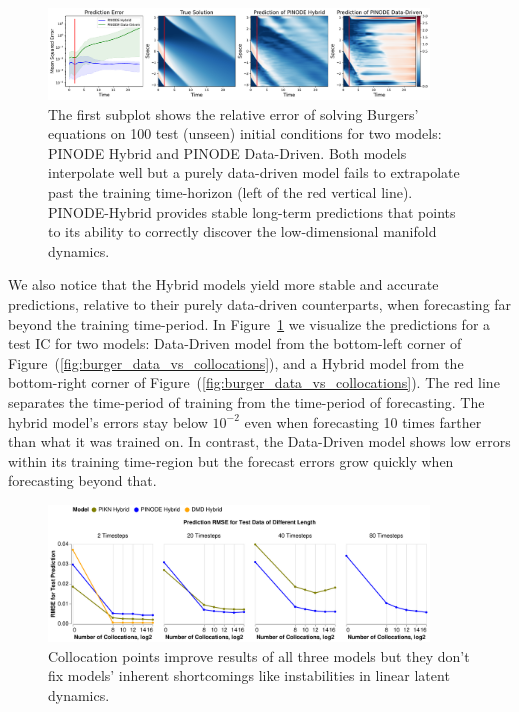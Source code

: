 \begin{figure}[ht]
    \centering
    \includegraphics[width=0.9\textwidth]{figures/example_burgers.pdf}
    \caption{The first subplot shows the relative error of solving Burgers' equations on 100 test (unseen) initial conditions for two models: PINODE Hybrid and PINODE Data-Driven. Both models interpolate well but a purely data-driven model fails to extrapolate past the training time-horizon (left of the red vertical line). PINODE-Hybrid provides stable long-term predictions that points to its ability to correctly discover the low-dimensional manifold dynamics.}
    \label{fig:burgers_example}
\end{figure}

We also notice that the Hybrid models yield more stable and accurate predictions, relative to their purely data-driven counterparts, when forecasting far beyond the training time-period. In Figure~\ref{fig:burgers_example} we visualize the predictions for a test IC for two models: Data-Driven model from the bottom-left corner of Figure~(\ref{fig:burger_data_vs_collocations}), and a Hybrid model from the bottom-right corner of Figure~(\ref{fig:burger_data_vs_collocations}). The red line separates the time-period of training from the time-period of forecasting. The hybrid model's errors stay below $10^{-2}$ even when forecasting 10 times farther than what it was trained on. In contrast, the Data-Driven model shows low errors within its training time-region but the forecast errors grow quickly when forecasting beyond that.

\begin{figure}[ht]
    \centering
    \includegraphics[width=0.9\textwidth]{figures/burgers_collocations_rmse.pdf}
    \caption{Collocation points improve results of all three models but they don't fix models' inherent shortcomings like instabilities in linear latent dynamics.\label{fig:burgers_collocations_rmse}}
\end{figure}

